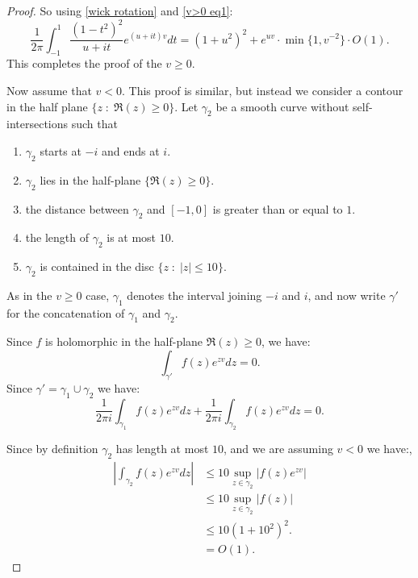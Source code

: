 \begin{proof}
        So using \eqref{wick rotation} and \eqref{v>0 eq1}:
        $$\frac1{2\pi}\int_{-1}^1\frac{(1-t^2)^2}{u+it}e^{(u+it)v}dt=(1+u^2)^2+e^{uv}\cdot\min\{1,v^{-2}\}\cdot O(1).$$
        This completes the proof of the $v \geq 0$.
        
        Now assume that $v < 0$.
        This proof is similar, but instead we consider a contour in the half plane $\{z\;:\;\Re(z)\geq 0\}$. 
        Let $\gamma_2$ be a smooth curve without self-intersections such that
        \begin{enumerate}
            \item $\gamma_2$ starts at $-i$ and ends at $i.$
            \item $\gamma_2$ lies in the half-plane $\{\Re(z)\geq0\}.$
            \item the distance between $\gamma_2$ and $[-1,0]$ is greater than or equal to $1$.
            \item the length of $\gamma_2$ is at most $10.$
            \item $\gamma_2$ is contained in the disc $\{z\;:\;|z| \leq 10\}$.
        \end{enumerate}
        As in the $v \geq 0$ case, $\gamma_1$ denotes the interval joining $-i$ and $i$, and now write $\gamma'$ for the concatenation of $\gamma_1$ and $\gamma_2$.

        Since $f$ is holomorphic in the half-plane $\Re(z) \geq 0$, we have:
        $$\int_{\gamma'}f(z)e^{zv}dz=0.$$
        Since $\gamma' = \gamma_1\cup\gamma_2$ we have:
        \begin{equation}\label{v<0 eq1}
            \frac1{2\pi i}\int_{\gamma_1}f(z)e^{zv}dz+\frac1{2\pi i}\int_{\gamma_2}f(z)e^{zv}dz=0.
        \end{equation}
        
        Since by definition $\gamma_2$ has length at most $10$, and we are assuming $v < 0$ we have:,
        \begin{align*}
            \left|\int_{\gamma_2}f(z)e^{zv}dz\right| &\leq 10\sup_{z\in\gamma_2}|f(z)e^{zv}|\\
                                                     &\leq 10\sup_{z \in \gamma_2}|f(z)|\\
                                                     &\leq 10(1+10^2)^2.\\
                                                     &=O(1).
        \end{align*}


\end{proof}

